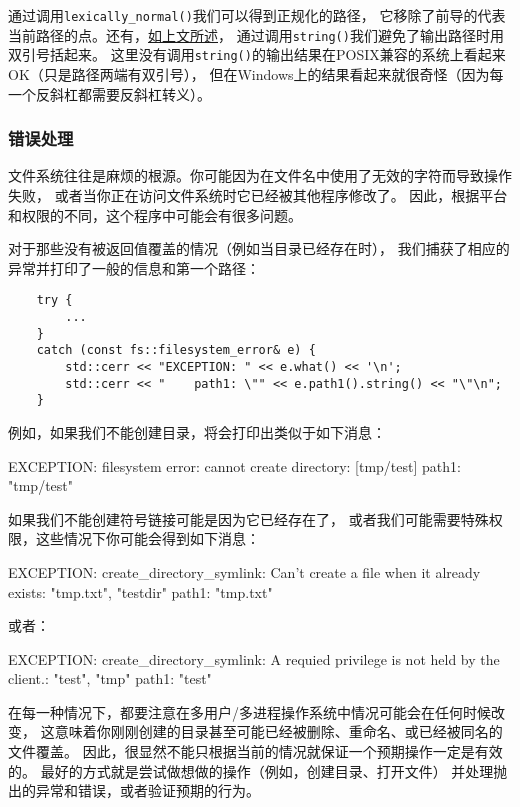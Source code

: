 通过调用\texttt{lexically\_normal()}我们可以得到正规化的路径，
它移除了前导的代表当前路径的点。还有，\hyperref[ch20.1.1.1]{如上文所述}，
通过调用\texttt{string()}我们避免了输出路径时用双引号括起来。
这里没有调用\texttt{string()}的输出结果在POSIX兼容的系统上看起来OK（只是路径两端有双引号），
但在Windows上的结果看起来就很奇怪（因为每一个反斜杠都需要反斜杠转义）。

\subsubsection{错误处理}\label{ch20.1.3.6}
文件系统往往是麻烦的根源。你可能因为在文件名中使用了无效的字符而导致操作失败，
或者当你正在访问文件系统时它已经被其他程序修改了。
因此，根据平台和权限的不同，这个程序中可能会有很多问题。

对于那些没有被返回值覆盖的情况（例如当目录已经存在时），
我们捕获了相应的异常并打印了一般的信息和第一个路径：
\begin{lstlisting}
    try {
        ...
    }
    catch (const fs::filesystem_error& e) {
        std::cerr << "EXCEPTION: " << e.what() << '\n';
        std::cerr << "    path1: \"" << e.path1().string() << "\"\n";
    }
\end{lstlisting}
例如，如果我们不能创建目录，将会打印出类似于如下消息：
\begin{blacklisting}
    EXCEPTION: filesystem error: cannot create directory: [tmp/test]
    path1: "tmp/test"
\end{blacklisting}
如果我们不能创建符号链接可能是因为它已经存在了，
或者我们可能需要特殊权限，这些情况下你可能会得到如下消息：\label{创建链接失败}
\begin{blacklisting}
    EXCEPTION: create_directory_symlink: Can't create a file when it already exists:
                                         "tmp\test\data.txt", "testdir"
        path1: "tmp\test\data.txt"
\end{blacklisting}
或者：
\begin{blacklisting}
    EXCEPTION: create_directory_symlink: A requied privilege is not held by the
                                         client.: "test", "tmp\slink"
        path1: "test"
\end{blacklisting}
在每一种情况下，都要注意在多用户/多进程操作系统中情况可能会在任何时候改变，
这意味着你刚刚创建的目录甚至可能已经被删除、重命名、或已经被同名的文件覆盖。
因此，很显然不能只根据当前的情况就保证一个预期操作一定是有效的。
最好的方式就是尝试做想做的操作（例如，创建目录、打开文件）
并处理抛出的异常和错误，或者验证预期的行为。

